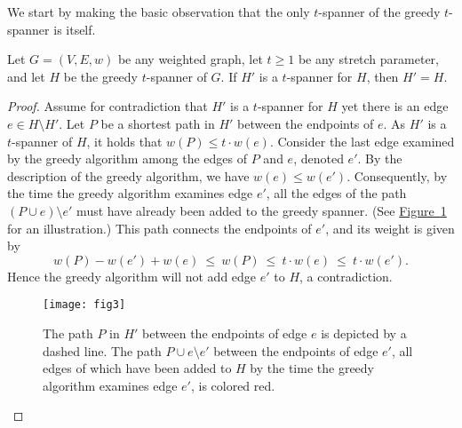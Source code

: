 \documentclass[11pt,letterpaper]{article}
\newcommand{\namedref}[2]{\hyperref[#2]{#1~\ref*{#2}}}
\newcommand{\figureref}[1]{\namedref{Figure}{#1}}
\begin{document}
We start by making the basic observation that the only $t$-spanner of the greedy $t$-spanner is itself.
\begin{lemma}
	\label{obs:spanner_of_greedy}
	Let $G=(V,E,w)$ be any weighted graph, let $t \ge 1$ be any stretch parameter, and let $H$ be the greedy $t$-spanner of $G$.
	If $H'$ is a $t$-spanner for $H$, then $H' = H$.
\end{lemma}
\begin{proof}
	Assume for contradiction that $H'$ is a $t$-spanner for $H$ yet there is an edge $e \in H \setminus H'$.
	Let $P$ be a shortest path in $H'$ between the endpoints of $e$. As $H'$ is a $t$-spanner of $H$,
	it holds that $w(P)\le t\cdot w(e)$.
	Consider the last edge examined by the greedy algorithm among the edges of $P$ and $e$, denoted $e'$.
	By the description of the greedy algorithm, we have $w(e) \le w(e')$.
	Consequently, by the time the greedy algorithm examines edge $e'$, all the edges of the path $(P \cup e) \setminus e'$ must have already been added to the greedy spanner.
	(See \figureref{fig:lem3} for an illustration.)
	This path connects the endpoints of $e'$, and its weight is given by $$w(P) - w(e') + w(e) ~\le~ w(P) ~\le~ t \cdot w(e) ~\le~ t \cdot w(e').$$
	Hence the greedy algorithm will not add edge $e'$ to $H$, a contradiction.
	\begin{figure}
		\begin{center}
			\texttt{[image: fig3]}
			\caption{\small The path $P$ in $H'$ between the endpoints of edge $e$ is depicted by a dashed line.
				The path $P\cup e \setminus e'$ between the endpoints of edge $e'$, all edges of which have been added to $H$ by the time the greedy algorithm examines edge $e'$,
				is colored red.}
			\label{fig:lem3}
		\end{center}
	\end{figure}
\end{proof}
\end{document}
